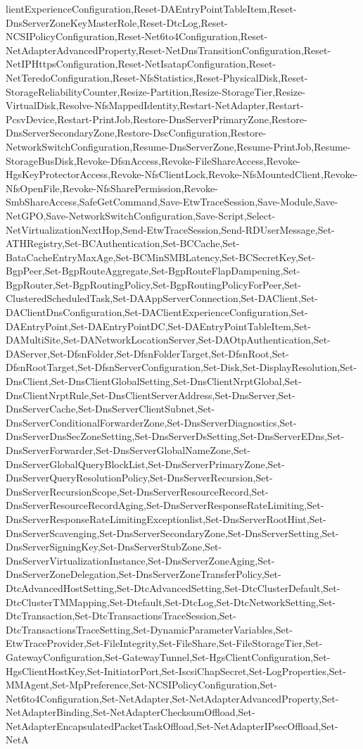 {{lientExperienceConfiguration,Reset-DAEntryPointTableItem,Reset-DnsServerZoneKeyMasterRole,Reset-DtcLog,Reset-NCSIPolicyConfiguration,Reset-Net6to4Configuration,Reset-NetAdapterAdvancedProperty,Reset-NetDnsTransitionConfiguration,Reset-NetIPHttpsConfiguration,Reset-NetIsatapConfiguration,Reset-NetTeredoConfiguration,Reset-NfsStatistics,Reset-PhysicalDisk,Reset-StorageReliabilityCounter,Resize-Partition,Resize-StorageTier,Resize-VirtualDisk,Resolve-NfsMappedIdentity,Restart-NetAdapter,Restart-PcsvDevice,Restart-PrintJob,Restore-DnsServerPrimaryZone,Restore-DnsServerSecondaryZone,Restore-DscConfiguration,Restore-NetworkSwitchConfiguration,Resume-DnsServerZone,Resume-PrintJob,Resume-StorageBusDisk,Revoke-DfsnAccess,Revoke-FileShareAccess,Revoke-HgsKeyProtectorAccess,Revoke-NfsClientLock,Revoke-NfsMountedClient,Revoke-NfsOpenFile,Revoke-NfsSharePermission,Revoke-SmbShareAccess,SafeGetCommand,Save-EtwTraceSession,Save-Module,Save-NetGPO,Save-NetworkSwitchConfiguration,Save-Script,Select-NetVirtualizationNextHop,Send-EtwTraceSession,Send-RDUserMessage,Set-ATHRegistry,Set-BCAuthentication,Set-BCCache,Set-BataCacheEntryMaxAge,Set-BCMinSMBLatency,Set-BCSecretKey,Set-BgpPeer,Set-BgpRouteAggregate,Set-BgpRouteFlapDampening,Set-BgpRouter,Set-BgpRoutingPolicy,Set-BgpRoutingPolicyForPeer,Set-ClusteredScheduledTask,Set-DAAppServerConnection,Set-DAClient,Set-DAClientDnsConfiguration,Set-DAClientExperienceConfiguration,Set-DAEntryPoint,Set-DAEntryPointDC,Set-DAEntryPointTableItem,Set-DAMultiSite,Set-DANetworkLocationServer,Set-DAOtpAuthentication,Set-DAServer,Set-DfsnFolder,Set-DfsnFolderTarget,Set-DfsnRoot,Set-DfsnRootTarget,Set-DfsnServerConfiguration,Set-Disk,Set-DisplayResolution,Set-DnsClient,Set-DnsClientGlobalSetting,Set-DnsClientNrptGlobal,Set-DnsClientNrptRule,Set-DnsClientServerAddress,Set-DnsServer,Set-DnsServerCache,Set-DnsServerClientSubnet,Set-DnsServerConditionalForwarderZone,Set-DnsServerDiagnostics,Set-DnsServerDnsSecZoneSetting,Set-DnsServerDsSetting,Set-DnsServerEDns,Set-DnsServerForwarder,Set-DnsServerGlobalNameZone,Set-DnsServerGlobalQueryBlockList,Set-DnsServerPrimaryZone,Set-DnsServerQueryResolutionPolicy,Set-DnsServerRecursion,Set-DnsServerRecursionScope,Set-DnsServerResourceRecord,Set-DnsServerResourceRecordAging,Set-DnsServerResponseRateLimiting,Set-DnsServerResponseRateLimitingExceptionlist,Set-DnsServerRootHint,Set-DnsServerScavenging,Set-DnsServerSecondaryZone,Set-DnsServerSetting,Set-DnsServerSigningKey,Set-DnsServerStubZone,Set-DnsServerVirtualizationInstance,Set-DnsServerZoneAging,Set-DnsServerZoneDelegation,Set-DnsServerZoneTransferPolicy,Set-DtcAdvancedHostSetting,Set-DtcAdvancedSetting,Set-DtcClusterDefault,Set-DtcClusterTMMapping,Set-Dtefault,Set-DtcLog,Set-DtcNetworkSetting,Set-DtcTransaction,Set-DtcTransactionsTraceSession,Set-DtcTransactionsTraceSetting,Set-DynamicParameterVariables,Set-EtwTraceProvider,Set-FileIntegrity,Set-FileShare,Set-FileStorageTier,Set-GatewayConfiguration,Set-GatewayTunnel,Set-HgsClientConfiguration,Set-HgsClientHostKey,Set-InitiatorPort,Set-IscsiChapSecret,Set-LogProperties,Set-MMAgent,Set-MpPreference,Set-NCSIPolicyConfiguration,Set-Net6to4Configuration,Set-NetAdapter,Set-NetAdapterAdvancedProperty,Set-NetAdapterBinding,Set-NetAdapterChecksumOffload,Set-NetAdapterEncapsulatedPacketTaskOffload,Set-NetAdapterIPsecOffload,Set-NetA}}
